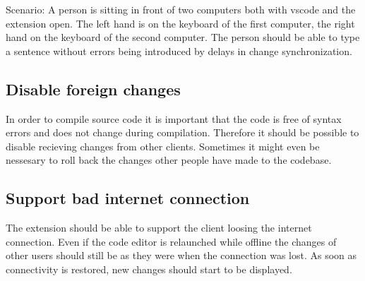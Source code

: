 Scenario: A person is sitting in front of two computers both with vscode and the extension open. The left hand is on the keyboard of the first computer, the right hand on the keyboard of the second computer. The person should be able to type a sentence without errors being introduced by delays in change synchronization.

\subsection{Disable foreign changes}

In order to compile source code it is important that the code is free of syntax errors and does not change during compilation. Therefore it should be possible to disable recieving changes from other clients. Sometimes it might even be nessesary to roll back the changes other people have made to the codebase.

\subsection{Support bad internet connection}

The extension should be able to support the client loosing the internet connection. Even if the code editor is relaunched while offline the changes of other users should still be as they were when the connection was lost. As soon as connectivity is restored, new changes should start to be displayed. 